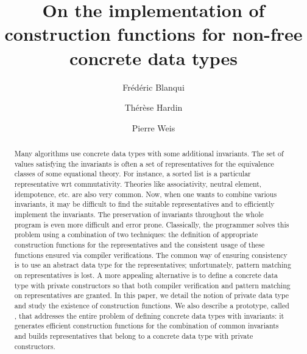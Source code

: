 
\title{On the implementation of construction functions for non-free concrete data types}

\author{Fr\'ed\'eric Blanqui
\and Th\'er\`ese Hardin
\and Pierre Weis}


\maketitle

\begin{abstract}
Many algorithms use concrete data types with some additional invariants. The
set of values satisfying the invariants is often a set of representatives for
the equivalence classes of some equational theory. For instance, a sorted list
is a particular representative wrt commutativity. Theories like associativity,
neutral element, idempotence, etc. are also very common. Now, when one wants to
combine various invariants, it may be difficult to find the suitable
representatives and to efficiently implement the invariants. The preservation
of invariants throughout the whole program is even more difficult and error
prone. Classically, the programmer solves this problem using a combination of
two techniques: the definition of appropriate construction functions for the
representatives and the consistent usage of these functions ensured via
compiler verifications. The common way of ensuring consistency is to use an
abstract data type for the representatives; unfortunately, pattern matching on
representatives is lost. A more appealing alternative is to define a concrete
data type with private constructors so that both compiler verification and
pattern matching on representatives are granted. In this paper, we detail the
notion of private data type and study the existence of construction
functions. We also describe a prototype, called \moca, that addresses the
entire problem of defining concrete data types with invariants: it generates
efficient construction functions for the combination of common invariants and
builds representatives that belong to a concrete data type with private
constructors.
\end{abstract}
